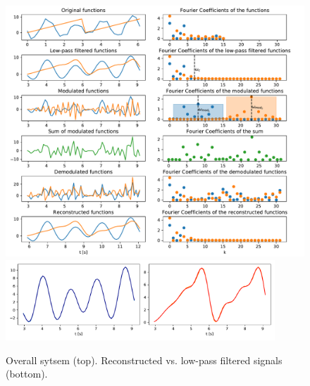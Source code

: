 \documentclass[12pt, a4paper]{report}
\begin{document}
\begin{figure}[h!]
	\centering
	\includegraphics[width=\textwidth]{figures/overall_sampling.pdf}
	\includegraphics[width=0.9\textwidth]{figures/sampling_cmp.pdf}
	\caption{Overall sytsem (top). Reconstructed vs. low-pass filtered signals (bottom).}
	\label{fig:overall}
\end{figure}
\end{document}
